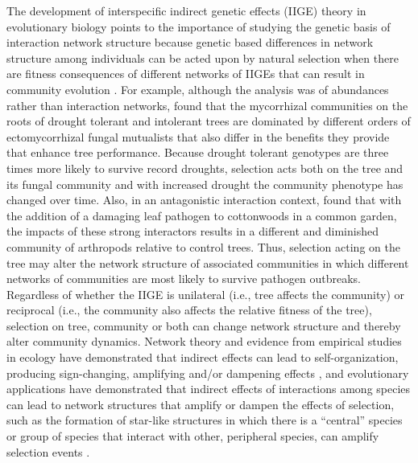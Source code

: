 \documentclass[fleqn,12pt]{olplainarticle}
\begin{document}
The development of interspecific indirect genetic effects (IIGE)
theory \cite{Shuster2006COMMUNITYSTRUCTURE} in evolutionary biology
points to the importance of studying the genetic basis of interaction
network structure because genetic based differences in network
structure among individuals can be acted upon by natural selection
when there are fitness consequences of different networks of IIGEs
that can result in community evolution
\cite{Whitham2020IntraspecificEvolution}. For example, although the
analysis was of abundances rather than interaction networks,
\citep{Gehring2014PlantChange, Gehring2017a} found that the
mycorrhizal communities on the roots of drought tolerant and
intolerant trees are dominated by different orders of ectomycorrhizal
fungal mutualists that also differ in the benefits they provide that
enhance tree performance. Because drought tolerant genotypes are three
times more likely to survive record droughts, selection acts both on
the tree and its fungal community and with increased drought the
community phenotype has changed over time. Also, in an antagonistic
interaction context, \citep{Busby2015} found that with the addition of
a damaging leaf pathogen to cottonwoods in a common garden, the
impacts of these strong interactors results in a different and
diminished community of arthropods relative to control trees. Thus,
selection acting on the tree may alter the network structure of
associated communities in which different networks of communities are
most likely to survive pathogen outbreaks. Regardless of whether the
IIGE is unilateral (i.e., tree affects the community) or reciprocal
(i.e., the community also affects the relative fitness of the tree),
selection on tree, community or both can change network structure
\cite{Whitham2020IntraspecificEvolution} and thereby alter community
dynamics. Network theory and evidence from empirical studies in
ecology have demonstrated that indirect effects can lead to
self-organization, producing sign-changing, amplifying and/or
dampening effects \cite{Newman2006,
  Sole2006Self-OrganizationEcosystems}, and evolutionary applications
have demonstrated that indirect effects of interactions among species
can lead to network structures that amplify or dampen the effects of
selection, such as the formation of star-like structures in which
there is a ``central'' species or group of species that interact with
other, peripheral species, can amplify selection events
\cite{Lieberman2005EvolutionaryGraphs}.
\end{document}
